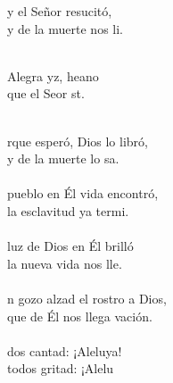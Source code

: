 \begin{cancion}%
	y el Señor resucitó,\\
	y de la muerte nos li. \\\jump\\
	\begin{chorus}%
	Alegra yz, heano\\
	que el Seor st.\\
	\end{chorus}%
	\jump\\
	rque esperó, Dios lo libró,\\
	y de la muerte lo sa.\\
\jump\\
	 pueblo en Él vida encontró,\\
	la esclavitud ya termi.\\
\jump\\
	 luz de Dios en Él brilló\\
	la nueva vida nos lle.\\
\jump\\
	n gozo alzad el rostro a Dios,\\
	que de Él nos llega vación.\\
\jump\\
	dos cantad: ¡Aleluya!\\
	todos gritad: ¡Alelu\\
\end{cancion}%
